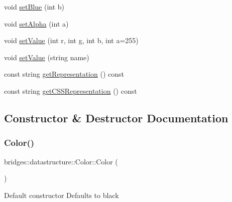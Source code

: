 \begin{DoxyCompactItemize}
\item 
void \hyperlink{classbridges_1_1datastructure_1_1_color_a829b0b914125ee30ce3d3e45a52a45c1}{set\+Blue} (int b)
\item 
void \hyperlink{classbridges_1_1datastructure_1_1_color_a19ff34702143ec54248438dfad02e4a2}{set\+Alpha} (int a)
\item 
void \hyperlink{classbridges_1_1datastructure_1_1_color_aa23d4b981b994b4065f904195ffd8595}{set\+Value} (int r, int g, int b, int a=255)
\item 
void \hyperlink{classbridges_1_1datastructure_1_1_color_ad6c95830bb6d69d39624f3989127aa93}{set\+Value} (string name)
\item 
const string \hyperlink{classbridges_1_1datastructure_1_1_color_a2ebb4e803c935cf151e3309700f3978d}{get\+Representation} () const
\item 
const string \hyperlink{classbridges_1_1datastructure_1_1_color_ab4916e855078346c3ac97eb6448e3e2b}{get\+C\+S\+S\+Representation} () const
\end{DoxyCompactItemize}


\subsection{Constructor \& Destructor Documentation}
\mbox{\label{classbridges_1_1datastructure_1_1_color_ad6b8b6b89a54ebea80d211679e10be3e}} 
\subsubsection{\texorpdfstring{Color()}{Color()}\hspace{0.1cm}{\footnotesize\ttfamily [1/3]}}
{\footnotesize\ttfamily bridges\+::datastructure\+::\+Color\+::\+Color (\begin{DoxyParamCaption}{ }\end{DoxyParamCaption})\hspace{0.3cm}{\ttfamily [inline]}}

Default constructor Defaults to black \mbox{\label{classbridges_1_1datastructure_1_1_color_a0b746741c261fdc010adab62bbdb862c}} 
